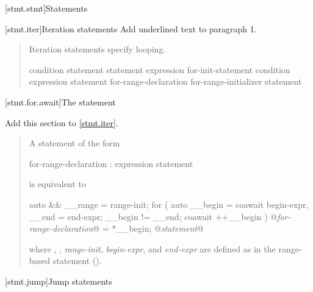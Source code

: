 
[stmt.stmt]{Statements}%

\setcounter{section}{4}
[stmt.iter]{Iteration statements}%
Add underlined text to paragraph 1.

\begin{quote}
\pnum
Iteration statements specify looping.

%
%
%
%
\begin{bnf}
	\br
	 condition \terminal{)} statement\br
	 statement  expression \terminal{) ;}\br
	 for-init-statement condition\opt \terminal{;} expression\opt \terminal{)} statement\br
	 for-range-declaration \terminal{:} for-range-initializer \terminal{)} statement\br
\end{bnf}
\end{quote}


\setcounter{subsection}{4}
[stmt.for.await]{The  statement}%

Add this section to \ref{stmt.iter}.


\begin{quote}
\pnum
A  statement of the form

\begin{ncbnf}
	 for-range-declaration : expression \terminal{)} statement
\end{ncbnf}
is equivalent to

\begin{codeblock}
	{
		auto && __range = range-init;
		for ( auto __begin = coawait begin-expr,
		__end = end-expr;
		__begin != __end;
		coawait ++__begin ) {
			@\textit{for-range-declaration}@ = *__begin;
			@\textit{statement}@
		}
	}
\end{codeblock}

where , , 
\textit{range-init}, \textit{begin-expr}, and \textit{end-expr} are defined as in the range-based  statement ().

\end{quote}

\setcounter{section}{5}
[stmt.jump]{Jump statements}%

